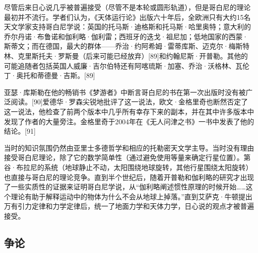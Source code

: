 尽管后来日心说几乎被普遍接受（尽管不是本轮或圆形轨道），但是哥白尼的理论最初并不流行。学者们认为，《天体运行论》出版六十年后，全欧洲只有大约15名天文学家支持哥白尼学说：英国的托马斯·迪格斯和托马斯·哈里奥特；意大利的乔尔丹诺·布鲁诺和伽利略·伽利雷；西班牙的迭戈·祖尼加；低地国家的西蒙·斯蒂文；而在德国，最大的群体——乔治·约阿希姆·雷蒂库斯、迈克尔·梅斯特林、克里斯托夫·罗斯曼（后来可能已经放弃）[89]和约翰尼斯·开普勒。其他的可能追随者包括英国人威廉·吉尔伯特还有阿喀琉斯·加塞、乔治·沃格林、瓦伦丁·奥托和蒂德曼·吉斯。[89]

亚瑟·库斯勒在他的畅销书《梦游者》中断言哥白尼的书在第一次出版时没有被广泛阅读。[90]爱德华·罗森尖锐地批评了这一说法，欧文·金格里奇也断然否定了这一说法，他检查了前两个版本中几乎所有幸存下来的副本，并在其中许多版本中发现了作者的大量旁注。金格里奇于2004年在《无人问津之书》一书中发表了他的结论。[91]

当时的知识氛围仍然由亚里士多德哲学和相应的托勒密天文学主导。当时没有理由接受哥白尼理论，除了它的数学简单性（通过避免使用等量来确定行星位置）。第谷·布拉尼的系统（地球静止不动，太阳围绕地球旋转，其他行星围绕太阳旋转）也直接与哥白尼的理论竞争。直到半个世纪后，随着开普勒和伽利略的研究才出现了一些实质性的证据来证明哥白尼学说，从“伽利略阐述惯性原理的时候开始……这个理论有助于解释运动中的物体为什么不会从地球上掉落。”直到艾萨克·牛顿提出万有引力定律和力学定律后，统一了地面力学和天体力学，日心说的观点才被普遍接受。

\subsection{争论}